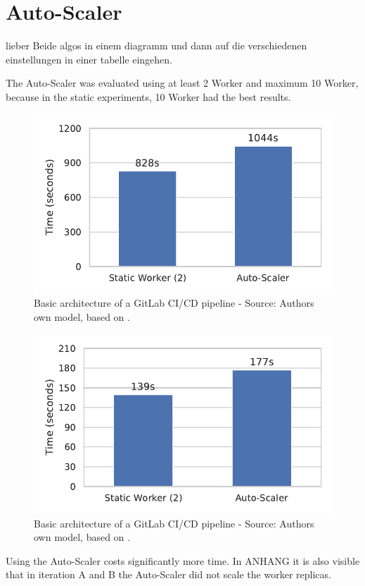 \section{Auto-Scaler}
lieber Beide algos in einem diagramm und dann auf die verschiedenen einstellungen in einer tabelle eingehen.


The Auto-Scaler was evaluated using at least 2 Worker and maximum 10 Worker, because in the static experiments, 10 Worker had the best results.
\begin{figure}[h]
\centering
\includegraphics[scale=1]{images/07_evaluation/mortgage/mortgage_auto_scaler_2_worker}
\caption{Basic architecture of a GitLab CI/CD pipeline - Source: Authors own model, based on \cite{Gitlab2020Docs}.}
\label{fig:07_mortgage_auto-scaler_results}
\end{figure}
\begin{figure}[h]
\centering
\includegraphics[scale=1]{images/07_evaluation/taxi/taxi_auto_scaler_2_worker}
\caption{Basic architecture of a GitLab CI/CD pipeline - Source: Authors own model, based on \cite{Gitlab2020Docs}.}
\label{fig:07_taxi_auto-scaler_results}
\end{figure}
Using the Auto-Scaler costs significantly more time. In ANHANG it is also visible that in iteration A and B the Auto-Scaler did not scale the worker replicas.
